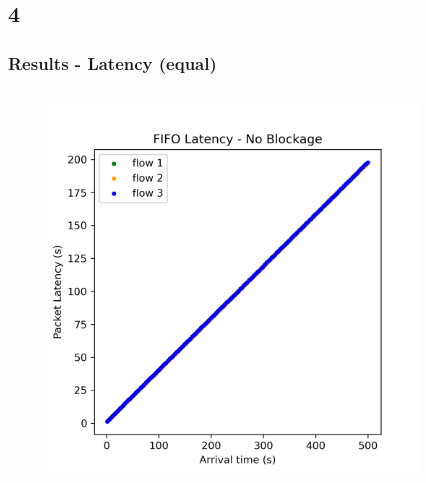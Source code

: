 \documentclass[compress]{beamer}
\begin{document}
    \subsection{4}
    \begin{frame}
        \frametitle{Results - Latency (equal)}
        \begin{columns}
            \begin{column}{0.32\textwidth}
                \begin{figure}
                    \centering
                    \includegraphics[width=\textwidth]{../img/fifo_equal}
                \end{figure}
            \end{column}
            \begin{column}{0.32\textwidth}
                \begin{figure}
                    \centering

\end{figure}
\end{column}
\end{columns}
\end{frame}
\end{document}
